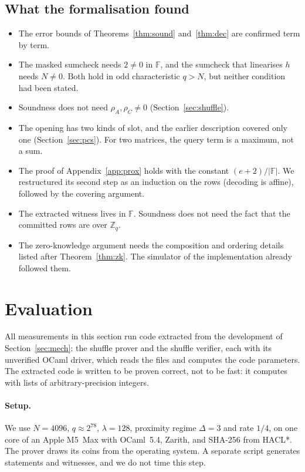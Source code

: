 \documentclass[sigconf,anonymous]{acmart}
\newcommand{\Zq}{\mathbb{Z}_q}
\newcommand{\F}{\mathbb{F}}
\begin{document}
\subsection{What the formalisation found}
\label{sec:findings}

\begin{itemize}[leftmargin=1.2em,itemsep=2pt,topsep=3pt]
\item The error bounds of Theorems~\ref{thm:sound} and~\ref{thm:dec} are confirmed term by term.
\item The masked sumcheck needs $2\ne 0$ in $\F$, and the sumcheck that linearises $h$ needs
  $N\ne 0$. Both hold in odd characteristic $q>N$, but neither condition had been stated.
\item Soundness does not need $\rho_A,\rho_C\ne 0$ (Section~\ref{sec:shuffle}).
\item The opening has two kinds of slot, and the earlier description covered only one
  (Section~\ref{sec:pcs}). For two matrices, the query term is a maximum, not a sum.
\item The proof of Appendix~\ref{app:prox} holds with the constant $(e+2)/|\F|$. We restructured its
  second step as an induction on the rows (decoding is affine), followed by the covering argument.
\item The extracted witness lives in $\F$. Soundness does not need the fact that the committed rows
  are over $\Zq$.
\item The zero-knowledge argument needs the composition and ordering details listed after
  Theorem~\ref{thm:zk}. The simulator of the implementation already followed them.
\end{itemize}

\section{Evaluation}
\label{sec:eval}

All measurements in this section run code extracted from the development of
Section~\ref{sec:mech}: the shuffle prover and the shuffle verifier, each with its unverified OCaml
driver, which reads the files and computes the code parameters. The extracted code is written to be
proven correct, not to be fast: it computes with lists of arbitrary-precision integers.

\paragraph{Setup.}
We use $N=4096$, $q\approx 2^{78}$, $\lambda=128$, proximity regime $\Delta=3$ and rate $1/4$, on one
core of an Apple M5~Max with OCaml~5.4, Zarith, and SHA-256 from HACL*. The prover draws its coins
from the operating system. A separate script generates statements and witnesses, and we do not time
this step.
\end{document}
